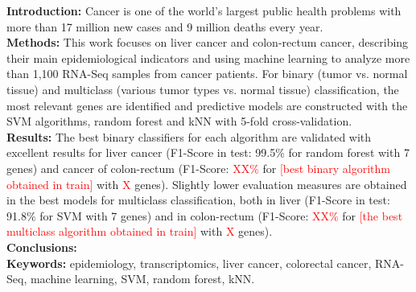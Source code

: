 \textbf{Introduction:} Cancer is one of the world's largest public health problems with more than 17 million new cases and 9 million deaths every year. \\

\textbf{Methods:} This work focuses on liver cancer and colon-rectum cancer, describing their main epidemiological indicators and using machine learning to analyze more than 1,100 RNA-Seq samples from cancer patients. For binary (tumor vs. normal tissue) and multiclass (various tumor types vs. normal tissue) classification, the most relevant genes are identified and predictive models are constructed with the SVM algorithms, random forest and kNN with 5-fold cross-validation. \\

\textbf{Results:} The best binary classifiers for each algorithm are validated with excellent results for liver cancer (F1-Score in test: 99.5\% for random forest with 7 genes) and cancer of colon-rectum (F1-Score: \textcolor{red}{XX\%} for \textcolor{red}{[best binary algorithm obtained in train]} with \textcolor{red}{X} genes). Slightly lower evaluation measures are obtained in the best models for multiclass classification, both in liver (F1-Score in test: 91.8\% for SVM with 7 genes) and in colon-rectum (F1-Score: \textcolor{red}{XX\%} for \textcolor{red}{[the best multiclass algorithm obtained in train]} with \textcolor{red}{X} genes). \\

\textbf{Conclusions:}\\

\textbf{Keywords:} epidemiology, transcriptomics, liver cancer, colorectal cancer, RNA-Seq, machine learning, SVM, random forest, kNN.

\newpage
\thispagestyle{empty}


